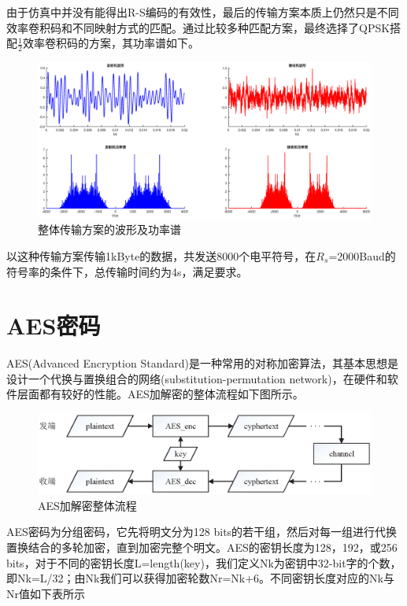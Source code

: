 由于仿真中并没有能得出R-S编码的有效性，最后的传输方案本质上仍然只是不同效率卷积码和不同映射方式的匹配。通过比较多种匹配方案，最终选择了QPSK搭配$\frac{1}{2}$效率卷积码的方案，其功率谱如下。
\begin{figure}[h]
    \centering
        \includegraphics[width=\textwidth]{./pic/transmit.eps}
    \caption{整体传输方案的波形及功率谱}
\end{figure}

以这种传输方案传输1kByte的数据，共发送8000个电平符号，在$R_s$=2000Baud的符号率的条件下，总传输时间约为4s，满足要求。

\section{AES密码}

AES(Advanced Encryption Standard)是一种常用的对称加密算法，其基本思想是设计一个代换与置换组合的网络(substitution-permutation network)，在硬件和软件层面都有较好的性能。AES加解密的整体流程如下图所示。

\begin{figure}[h]
    \centering
    \includegraphics[width=\textwidth,trim=0 20 0 20,clip]{./pic/AES_flow.eps}
    \caption{AES加解密整体流程}
\end{figure}

AES密码为分组密码，它先将明文分为128 bits的若干组，然后对每一组进行代换置换结合的多轮加密，直到加密完整个明文。AES的密钥长度为128，192，或256 bits，对于不同的密钥长度L=length(key)，我们定义Nk为密钥中32-bit字的个数，即Nk=L/32；由Nk我们可以获得加密轮数Nr=Nk+6。不同密钥长度对应的Nk与Nr值如下表所示

